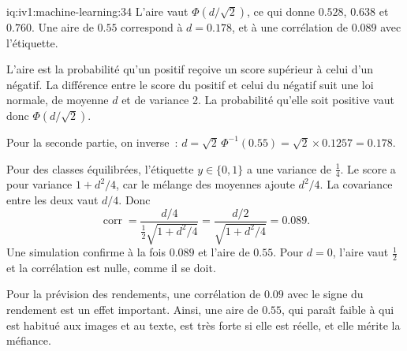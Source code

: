 \begin{solution}{iq:iv1:machine-learning:34}
L'aire vaut $\Phi(d/\sqrt{2})$, ce qui donne $0.528$, $0.638$ et $0.760$. Une aire de $0.55$ correspond à $d = 0.178$, et à une corrélation de $0.089$ avec l'étiquette.

L'aire est la probabilité qu'un positif reçoive un score supérieur à celui d'un négatif. La différence entre le score du positif et celui du négatif suit une loi normale, de moyenne $d$ et de variance 2. La probabilité qu'elle soit positive vaut donc $\Phi(d/\sqrt{2})$.

Pour la seconde partie, on inverse~: $d = \sqrt{2}\,\Phi^{-1}(0.55) = \sqrt{2} \times 0.1257 = 0.178$.

Pour des classes équilibrées, l'étiquette $y \in \{0, 1\}$ a une variance de $\frac14$. Le score a pour variance $1 + d^2/4$, car le mélange des moyennes ajoute $d^2/4$. La covariance entre les deux vaut $d/4$. Donc
\[
\operatorname{corr} = \frac{d/4}{\frac12\sqrt{1 + d^2/4}} = \frac{d/2}{\sqrt{1 + d^2/4}} = 0.089.
\]
Une simulation confirme à la fois $0.089$ et l'aire de $0.55$. Pour $d = 0$, l'aire vaut $\frac12$ et la corrélation est nulle, comme il se doit.

Pour la prévision des rendements, une corrélation de $0.09$ avec le signe du rendement est un effet important. Ainsi, une aire de $0.55$, qui paraît faible à qui est habitué aux images et au texte, est très forte si elle est réelle, et elle mérite la méfiance.



\end{solution}


